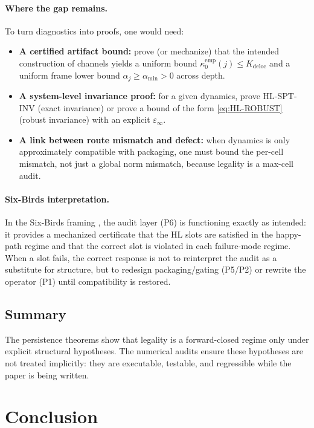 \documentclass[11pt]{article}
\begin{document}
\paragraph{Where the gap remains.}
To turn diagnostics into proofs, one would need:
\begin{itemize}
\item \textbf{A certified artifact bound:} prove (or mechanize) that the intended construction of channels yields a uniform bound $\kappa^{\mathrm{emp}}_0(j)\le K_{\mathrm{deloc}}$ and a uniform frame lower bound $\alpha_j\ge \alpha_{\min}>0$ across depth.
\item \textbf{A system-level invariance proof:} for a given dynamics, prove HL-SPT-INV (exact invariance) or prove a bound of the form \eqref{eq:HL-ROBUST} (robust invariance) with an explicit $\varepsilon_\infty$.
\item \textbf{A link between route mismatch and defect:} when dynamics is only approximately compatible with packaging, one must bound the per-cell mismatch, not just a global norm mismatch, because legality is a max-cell audit.
\end{itemize}

\paragraph{Six-Birds interpretation.}
In the Six-Birds framing \cite{Tsiokos2026SixBirds}, the audit layer (P6) is functioning exactly as intended:
it provides a mechanized certificate that the HL slots are satisfied in the happy-path regime and that the correct slot is violated in each failure-mode regime.
When a slot fails, the correct response is not to reinterpret the audit as a substitute for structure, but to redesign packaging/gating (P5/P2) or rewrite the operator (P1) until compatibility is restored.

\subsection{Summary}

The persistence theorems show that legality is a forward-closed regime only under explicit structural hypotheses.
The numerical audits ensure these hypotheses are not treated implicitly: they are executable, testable, and regressible while the paper is being written.
 \section{Conclusion}\label{sec:conclusion}
\end{document}

